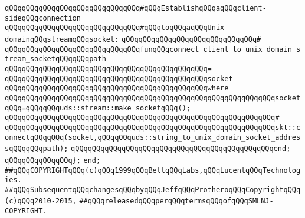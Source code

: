 \verb|qQQqqQQqqQQqqQQqqQQqqQQqqQQqqQQq#qQQqEstablishqQQqaqQQqclient-sideqQQqconnection|\newline
\verb|qQQqqQQqqQQqqQQqqQQqqQQqqQQqqQQq#qQQqtoqQQqaqQQqUnix-domainqQQqstreamqQQqsocket:|\newline
\verb|qQQqqQQqqQQqqQQqqQQqqQQqqQQqqQQq#|\newline
\verb|qQQqqQQqqQQqqQQqqQQqqQQqqQQqqQQqfunqQQqconnect_client_to_unix_domain_stream_socketqQQqqQQqpath|\newline
\verb|qQQqqQQqqQQqqQQqqQQqqQQqqQQqqQQqqQQqqQQqqQQqqQQq=|\newline
\verb|qQQqqQQqqQQqqQQqqQQqqQQqqQQqqQQqqQQqqQQqqQQqqQQqsocket|\newline
\verb|qQQqqQQqqQQqqQQqqQQqqQQqqQQqqQQqqQQqqQQqqQQqqQQqwhere|\newline
\verb|qQQqqQQqqQQqqQQqqQQqqQQqqQQqqQQqqQQqqQQqqQQqqQQqqQQqqQQqqQQqqQQqsocketqQQq=qQQqqQQquds::stream::make_socketqQQq();|\newline
\verb|qQQqqQQqqQQqqQQqqQQqqQQqqQQqqQQqqQQqqQQqqQQqqQQqqQQqqQQqqQQqqQQq#|\newline
\verb|qQQqqQQqqQQqqQQqqQQqqQQqqQQqqQQqqQQqqQQqqQQqqQQqqQQqqQQqqQQqqQQqskt::connectqQQqqQQq(socket,qQQqqQQquds::string_to_unix_domain_socket_addressqQQqqQQqpath);|\newline
\verb|qQQqqQQqqQQqqQQqqQQqqQQqqQQqqQQqqQQqqQQqqQQqqQQqend;|\newline
\verb|qQQqqQQqqQQqqQQq};|\newline
\verb|end;|\newline
\newline
\newline
\verb|##qQQqCOPYRIGHTqQQq(c)qQQq1999qQQqBellqQQqLabs,qQQqLucentqQQqTechnologies.|\newline
\verb|##qQQqSubsequentqQQqchangesqQQqbyqQQqJeffqQQqProtheroqQQqCopyrightqQQq(c)qQQq2010-2015,|\newline
\verb|##qQQqreleasedqQQqperqQQqtermsqQQqofqQQqSMLNJ-COPYRIGHT.|\newline

